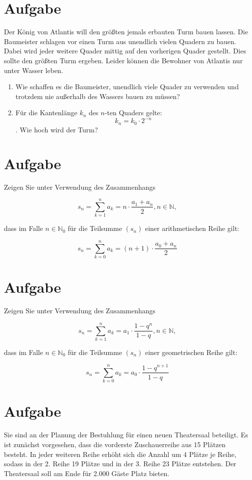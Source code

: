 \documentclass[fontsize=11pt, parskip=half]{scrartcl}
\newcommand{\N}{\mathbb{N}}
\begin{document}
\section{Aufgabe}
Der König von Atlantis will den größten jemals erbauten Turm bauen lassen. Die Baumeister schlagen vor einen Turm aus unendlich vielen Quadern zu bauen. Dabei wird jeder weitere Quader mittig auf den vorherigen Quader gestellt.
Dies sollte den größten Turm ergeben. Leider können die Bewohner von Atlantis nur unter Wasser leben. 
\begin{enumerate}[label=\alph*)]
 \item Wie schaffen es die Baumeister, unendlich viele Quader zu verwenden und trotzdem nie außerhalb des Wassers bauen zu müssen?
 \item Für die Kantenlänge $k_n$ des $n$-ten Quaders gelte: $$k_n = k_0 \cdot 2^{-n}$$. Wie hoch wird der Turm? 
\end{enumerate}   

\section{Aufgabe}
Zeigen Sie unter Verwendung des Zusammenhangs

$$ s_n =  \displaystyle \sum_{k=1}^n a_k = n \cdot \frac{a_1 +a_n}{2}, n \in \N,$$

dass im Falle $n \in \N_0$ für die Teilsumme $(s_n)$ einer
arithmetischen Reihe gilt:

$$ s_n =  \displaystyle \sum_{k=0}^n a_k = (n+1) \cdot \frac{a_0 +
a_n}{2}
$$

\section{Aufgabe}
Zeigen Sie unter Verwendung des Zusammenhangs

$$ s_n =  \displaystyle \sum_{k=1}^n a_k = a_1 \cdot \frac{1 -
q^n}{1-q}, n \in \N,
$$

dass im Falle $n \in \N_0$ für die Teilsumme $(s_n)$ einer
geometrischen Reihe gilt:

$$ s_n =  \displaystyle \sum_{k=0}^n a_k = a_0 \cdot \frac{1 -
q^{n+1}}{1-q}
$$

\section{Aufgabe}
Sie sind an der Planung der Bestuhlung für einen neuen
Theatersaal beteiligt. Es ist zunächst vorgesehen, dass die
vorderste Zuschauerreihe aus 15 Plätzen besteht. In jeder weiteren
Reihe erhöht sich die Anzahl um 4 Plätze je Reihe, sodass in der 2.
Reihe 19 Plätze und in der 3. Reihe 23 Plätze entstehen. Der Theatersaal soll am Ende für 2.000 Gäste Platz bieten.\\[-0.5cm]
\end{document}
